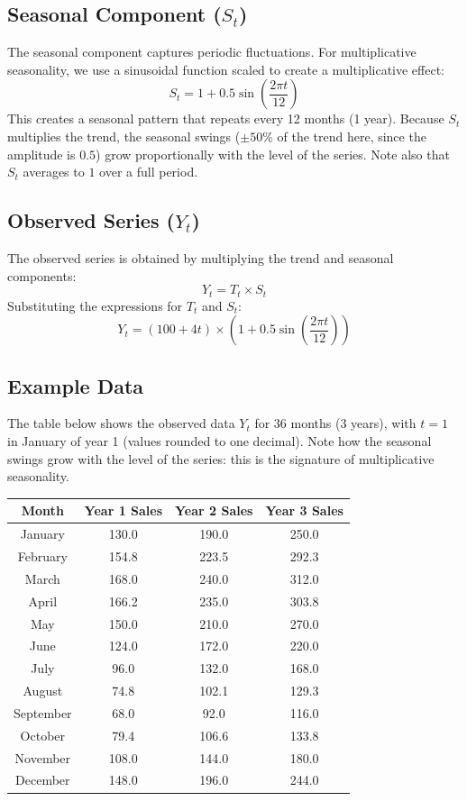 \begin{notechapter}
\subsection{Seasonal Component (\( S_t \))}
The seasonal component captures periodic fluctuations.
For multiplicative seasonality, we use a sinusoidal function scaled
to create a multiplicative effect:
\[
S_t = 1 + 0.5 \sin\left(\frac{2\pi t}{12}\right)
\]
This creates a seasonal pattern that repeats every 12 months (1 year).
Because $S_t$ multiplies the trend, the seasonal swings ($\pm 50\%$ of the trend here, since the amplitude is $0.5$) grow proportionally with the level of the series. Note also that $S_t$ averages to $1$ over a full period.

\subsection{Observed Series (\( Y_t \))}
The observed series is obtained by multiplying the trend and seasonal
components:
\[
Y_t = T_t \times S_t
\]
Substituting the expressions for \( T_t \) and \( S_t \):
\[
Y_t = (100 + 4t) \times \left(1 + 0.5 \sin\left(\frac{2\pi t}{12}\right)\right)
\]

\subsection{Example Data}
The table below shows the observed data \( Y_t \) for 36 months (3 years), with $t=1$ in January of year 1 (values rounded to one decimal). Note how the seasonal swings grow with the level of the series: this is the signature of multiplicative seasonality.

\begin{center}
\begin{tabular}{|c|c|c|c|}
\hline
Month & Year 1 Sales & Year 2 Sales & Year 3 Sales \\
\hline
January & 130.0 & 190.0 & 250.0 \\
February & 154.8 & 223.5 & 292.3 \\
March & 168.0 & 240.0 & 312.0 \\
April & 166.2 & 235.0 & 303.8 \\
May & 150.0 & 210.0 & 270.0 \\
June & 124.0 & 172.0 & 220.0 \\
July & 96.0 & 132.0 & 168.0 \\
August & 74.8 & 102.1 & 129.3 \\
September & 68.0 & 92.0 & 116.0 \\
October & 79.4 & 106.6 & 133.8 \\
November & 108.0 & 144.0 & 180.0 \\
December & 148.0 & 196.0 & 244.0 \\
\hline
\end{tabular}
\end{center}


\end{notechapter}
